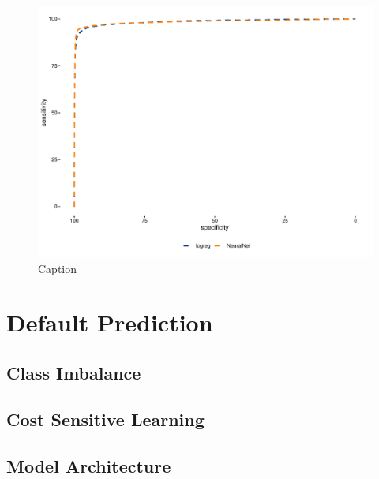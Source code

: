 \begin{figure}[H]
    \centering
    \includegraphics[width = \textwidth]{Figures/p_roc.pdf}
    \caption{Caption}
    \label{fig:my_label}
\end{figure}

    \section{Default Prediction}
    
        \subsection{Class Imbalance}
        
        \subsection{Cost Sensitive Learning}
        
        \subsection{Model Architecture}
